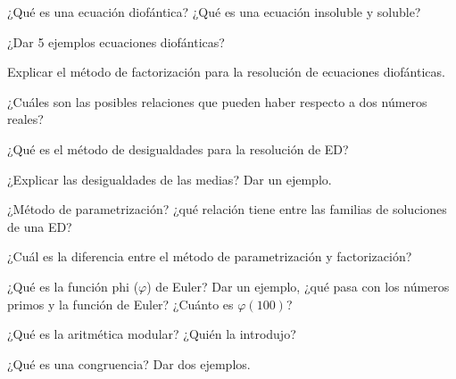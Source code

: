 \begin{activity}[][5 min]
    ¿Qué es una ecuación diofántica?
    ¿Qué es una ecuación insoluble y soluble?
\end{activity}

\begin{activity}[][5 min]
    ¿Dar 5 ejemplos ecuaciones diofánticas?
\end{activity}

\begin{activity}[][5 min]
    Explicar el método de factorización para la resolución de ecuaciones diofánticas.
\end{activity}

\begin{activity}[][5 min]
    ¿Cuáles son las posibles relaciones que pueden haber respecto a dos números reales?
\end{activity}

\begin{activity}[][5 min]
    ¿Qué es el método de desigualdades para la resolución de ED?
\end{activity}

\begin{activity}[][5 min]
    ¿Explicar las desigualdades de las medias?
    Dar un ejemplo.
\end{activity}

\begin{activity}[][5 min]
    ¿Método de parametrización?
    ¿qué relación tiene entre las familias de soluciones de una ED?
\end{activity}

\begin{activity}[][5 min]
    ¿Cuál es la diferencia entre el método de parametrización y factorización?
\end{activity}

\begin{activity}[][5 min]
    ¿Qué es la función phi ($\varphi$) de Euler?
    Dar un ejemplo, ¿qué pasa con los números primos y la función de Euler?
    ¿Cuánto es $\varphi(100)$?
\end{activity}

\begin{activity}[][5 min]
    ¿Qué es la aritmética modular?
    ¿Quién la introdujo?
\end{activity}

\begin{activity}[][5 min]
    ¿Qué es una congruencia?
    Dar dos ejemplos.
\end{activity}

